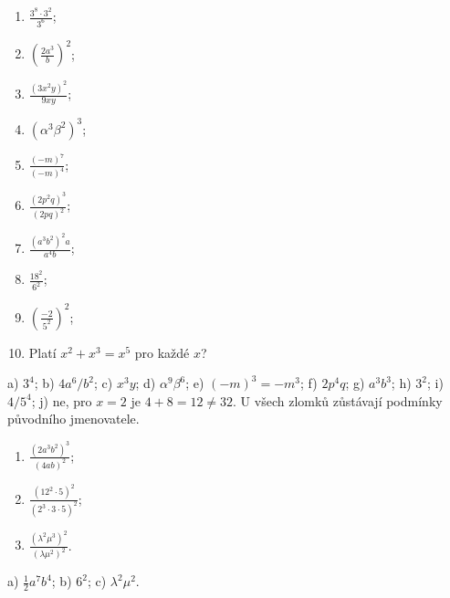\documentclass[11pt,a4paper]{article}
\begin{document}
\begin{zadaniReseniBox}[title={Domácí úkol 1 — deset úloh}]
\begin{enumerate}[label=\alph*)]
\item $\frac{3^8\cdot3^2}{3^6}$;
\item $\left(\frac{2a^3}{b}\right)^2$;
\item $\frac{(3x^2y)^2}{9xy}$;
\item $(\alpha^3\beta^2)^3$;
\item $\frac{(-m)^7}{(-m)^4}$;
\item $\frac{(2p^2q)^3}{(2pq)^2}$;
\item $\frac{(a^3b^2)^2a}{a^4b}$;
\item $\frac{18^2}{6^2}$;
\item $\left(\frac{-2}{5^2}\right)^2$;
\item Platí $x^2+x^3=x^5$ pro každé $x$?
\end{enumerate}
\tcblower
 a) $3^4$; b) $4a^6/b^2$; c) $x^3y$;
 d) $\alpha^9\beta^6$; e) $(-m)^3=-m^3$;
 f) $2p^4q$; g) $a^3b^3$; h) $3^2$; i) $4/5^4$;
 j) ne, pro $x=2$ je $4+8=12\ne32$.
U všech zlomků zůstávají podmínky původního jmenovatele.
\end{zadaniReseniBox}
\begin{zadaniReseniBox}[title={Domácí úkol 2 — volitelný, tři náročnější příklady},breakable=false]
\begin{enumerate}[label=\alph*)]
\item $\frac{(2a^3b^2)^3}{(4ab)^2}$;
\item $\frac{(12^2\cdot5)^2}{(2^3\cdot3\cdot5)^2}$;
\item $\frac{(\lambda^2\mu^3)^2}{(\lambda\mu^2)^2}$.
\end{enumerate}
\tcblower
 a) $\frac12a^7b^4$; b) $6^2$; c) $\lambda^2\mu^2$.
\end{zadaniReseniBox}
\end{document}
